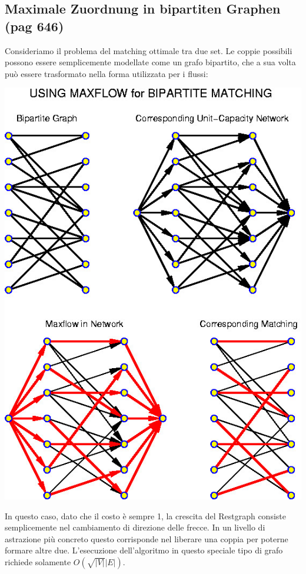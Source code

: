 \documentclass[a4paper]{book}
\begin{document}
\subsection{Maximale Zuordnung in bipartiten Graphen (pag 646)}
Consideriamo il problema del matching ottimale tra due set. Le coppie possibili possono essere semplicemente modellate come un grafo bipartito, che a sua volta può essere trasformato nella forma utilizzata per i flussi:
\begin{center}
\includegraphics[scale=0.5]{Figures/matching.jpg}
\end{center}
In questo caso, dato che il costo è sempre 1, la crescita del Restgraph consiste semplicemente nel cambiamento di direzione delle frecce. In un livello di astrazione più concreto questo corrisponde nel liberare una coppia per poterne formare altre due. L'esecuzione dell'algoritmo in questo speciale tipo di grafo richiede solamente $O(\sqrt{|V|}|E|)$.
\end{document}
